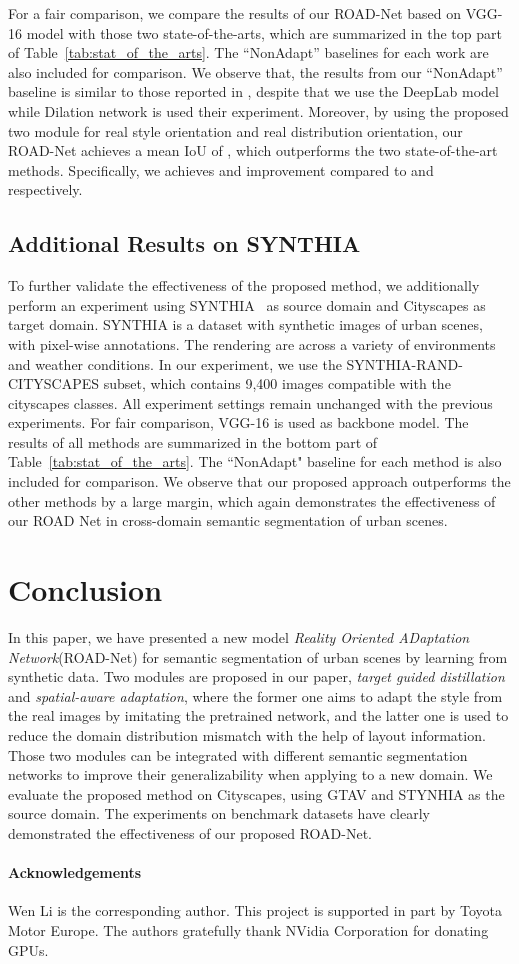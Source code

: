 \documentclass[10pt,twocolumn,letterpaper]{article}
\begin{document}
For a fair comparison, we compare the results of our ROAD-Net based on VGG-16 model with those two state-of-the-arts, which are summarized in the top part of Table~\ref{tab:stat_of_the_arts}. The ``NonAdapt'' baselines for each work are also included for comparison. We observe that, the results from our ``NonAdapt'' baseline is similar to those reported in \cite{hoffman2016fcns,zhang2017curriculum}, despite that we use the DeepLab model while Dilation network is used their experiment. Moreover, by using the proposed two module for real style orientation and real distribution orientation, our ROAD-Net achieves a mean IoU of , which outperforms the two state-of-the-art methods. Specifically, we achieves  and  improvement compared to \cite{zhang2017curriculum} and \cite{hoffman2016fcns} respectively.


\subsection{Additional Results on SYNTHIA}
To further validate the effectiveness of the proposed method, we additionally perform an experiment using SYNTHIA~\cite{ros2016synthia} as source domain and Cityscapes as target domain. SYNTHIA is a dataset with synthetic images of urban scenes, with pixel-wise annotations. The rendering are across a variety of environments and weather conditions. In our experiment, we use the SYNTHIA-RAND-CITYSCAPES subset, which contains 9,400 images compatible with the cityscapes classes. All experiment settings remain unchanged with the previous experiments. For fair comparison, VGG-16 is used as backbone model. The results of all methods are summarized in the bottom part of Table~\ref{tab:stat_of_the_arts}. The ``NonAdapt" baseline for each method is also included for comparison. We observe that our proposed approach outperforms the other methods by a large margin, which again demonstrates the effectiveness of our ROAD Net in cross-domain semantic segmentation of urban scenes.  



\section{Conclusion}
In this paper, we have presented a new model \textit{Reality Oriented ADaptation Network}(ROAD-Net) for semantic segmentation of urban scenes by learning from synthetic data. Two modules are proposed in our paper, \textit{target guided distillation} and \textit{spatial-aware adaptation}, where the former one aims to adapt the style from the real images by imitating the pretrained network, and the latter one is used to reduce the domain distribution mismatch with the help of layout information. Those two modules can be integrated with different semantic segmentation networks to improve their generalizability when applying to a new domain. We evaluate the proposed method on Cityscapes, using GTAV and STYNHIA as the source domain. The experiments on benchmark datasets have clearly demonstrated the effectiveness of our proposed ROAD-Net.

\paragraph{Acknowledgements}
Wen Li is the corresponding author. This project is supported in part by Toyota Motor Europe. The authors gratefully thank NVidia Corporation for donating GPUs.

{\small


}
\end{document}
